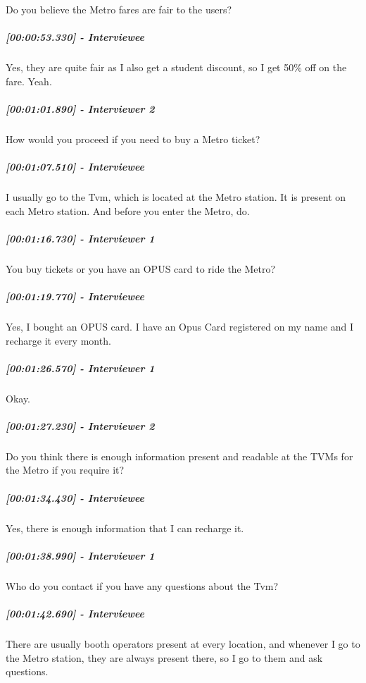 \documentclass[a4paper,12pt]{article}
\begin{document}
Do you believe the Metro fares are fair to the users?

\hypertarget{interviewee-8}{%
\subparagraph{{[}00:00:53.330{]} - Interviewee}\label{interviewee-8}}

Yes, they are quite fair as I also get a student discount, so I get 50\%
off on the fare. Yeah.

\hypertarget{interviewer-2-5}{%
\subparagraph{{[}00:01:01.890{]} - Interviewer
2}\label{interviewer-2-5}}

How would you proceed if you need to buy a Metro ticket?

\hypertarget{interviewee-9}{%
\subparagraph{{[}00:01:07.510{]} - Interviewee}\label{interviewee-9}}

I usually go to the Tvm, which is located at the Metro station. It is
present on each Metro station. And before you enter the Metro, do.

\hypertarget{interviewer-1-4}{%
\subparagraph{{[}00:01:16.730{]} - Interviewer
1}\label{interviewer-1-4}}

You buy tickets or you have an OPUS card to ride the Metro?

\hypertarget{interviewee-10}{%
\subparagraph{{[}00:01:19.770{]} - Interviewee}\label{interviewee-10}}

Yes, I bought an OPUS card. I have an Opus Card registered on my name
and I recharge it every month.

\hypertarget{interviewer-1-5}{%
\subparagraph{{[}00:01:26.570{]} - Interviewer
1}\label{interviewer-1-5}}

Okay.

\hypertarget{interviewer-2-6}{%
\subparagraph{{[}00:01:27.230{]} - Interviewer
2}\label{interviewer-2-6}}

Do you think there is enough information present and readable at the
TVMs for the Metro if you require it?

\hypertarget{interviewee-11}{%
\subparagraph{{[}00:01:34.430{]} - Interviewee}\label{interviewee-11}}

Yes, there is enough information that I can recharge it.

\hypertarget{interviewer-1-6}{%
\subparagraph{{[}00:01:38.990{]} - Interviewer
1}\label{interviewer-1-6}}

Who do you contact if you have any questions about the Tvm?

\hypertarget{interviewee-12}{%
\subparagraph{{[}00:01:42.690{]} - Interviewee}\label{interviewee-12}}

There are usually booth operators present at every location, and
whenever I go to the Metro station, they are always present there, so I
go to them and ask questions.
\end{document}

